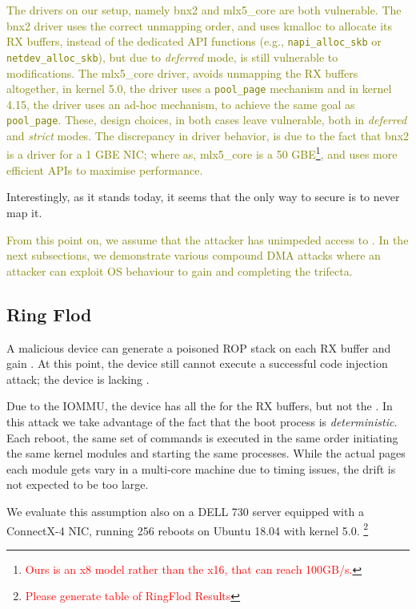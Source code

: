 \textcolor{olive}{
The drivers on our setup, namely bnx2 and mlx5\_core are both vulnerable. The bnx2 driver uses the correct unmapping order, and uses kmalloc to allocate its RX buffers, instead of the dedicated API functions (e.g., \texttt{napi\_alloc\_skb} or \texttt{netdev\_alloc\_skb}), but due to \emph{deferred} mode, \shinfo{} is still vulnerable to modifications.
The mlx5\_core driver, avoids unmapping the RX buffers altogether, in kernel 5.0, the driver uses a \texttt{pool\_page} mechanism\cite{page_pool} and in kernel 4.15, the driver uses an ad-hoc mechanism, to achieve the same goal as \texttt{pool\_page}. These, design choices, in both cases leave \shinfo{} vulnerable, both in \emph{deferred} and \emph{strict} modes.  
The discrepancy in driver behavior, is due to the fact that bnx2 is a driver for a 1 GBE NIC; where as, mlx5\_core is a 50 GBE\footnote{\textcolor{red}{Ours is an x8 model rather than the x16, that can reach 100GB/s.}}, and uses more efficient APIs to maximise performance.}



\smallskip
Interestingly, as it stands today, it seems that the only way to secure \shinfo{} is to never map it. 


\smallskip
\textcolor{olive}{From this point on, we assume that the attacker has unimpeded access to \oportunity{}. In the next subsections, we demonstrate various compound DMA attacks where an attacker can exploit OS behaviour to gain \means{} and \motivation{} completing the trifecta.}

\subsection{Ring Flod}\label{sec:ringflod}

A malicious device can generate a poisoned ROP stack on each RX buffer and gain \motivation{}. At this point, the device still cannot execute a successful code injection attack; the device is lacking \means{}. 

Due to the IOMMU, the device has all the \iova{} for the RX buffers, but not the \kva{}. In this attack we take advantage of the fact that the boot process is \emph{deterministic}. Each reboot, the same set of commands is executed in the same order initiating the same kernel modules and starting the same processes. While the actual pages each module gets vary in a multi-core machine due to timing issues, the drift is not expected to be too large.

We evaluate this assumption also on a DELL 730 server equipped with a ConnectX-4 NIC, running 256 reboots on Ubuntu 18.04 with kernel 5.0. 
\footnote{\textcolor{red}{Please generate table of RingFlod Results}}

